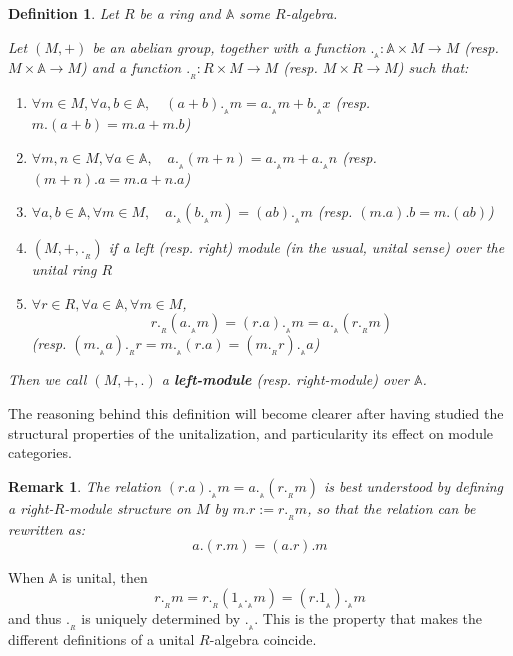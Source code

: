 \documentclass[a4paper,fleqn]{cas-sc}
\newtheorem{rem}{Remark}%
\newtheorem{dfnt}{Definition}%
\newcommand{\bA}{\mathbb{A}}
\begin{document}
\begin{dfnt}
\label{def:modules}
    Let $R$ be a ring and $\bA$ some $R$-algebra.
    
    Let  $(M,+)$ be an abelian group,
 together with a function $._{_\bA} : \bA \times M \to M$ (resp. $M \times \bA \to M$) and a function $._{_R} : R \times M \to M$ (resp. $M \times R \to M$) such that:
 \begin{enumerate}
    \item $\forall m \in M, \forall a,b \in \bA, \quad
    (a+b)._{_\bA}m = a._{_\bA}m + b._{_\bA}x$ (resp. $m.(a+b) = m.a + m.b$)
    \item $\forall m, n\in M, \forall a \in \bA, \quad
    a._{_\bA}(m+n) = a._{_\bA}m + a._{_\bA}n$ (resp. $(m+n).a = m.a + n.a$)
    \item $\forall a,b \in \bA, \forall m \in M, \quad
    a._{_\bA}(b._{_\bA}m) = (ab)._{_\bA}m$ (resp. $(m.a).b = m.(ab)$)
    \item $(M,+,._{_R})$ if a left (resp. right) module (in the usual, unital sense) over the unital ring $R$
    \item $\forall r \in R, \forall a \in \bA, \forall m \in M$,
    \[r._{_R}(a._{_\bA} m) = (r.a)._{_\bA} m = a._{_\bA} (r._{_R} m)\]
    (resp. \((m._{_\bA} a)._{_R} r = m._{_\bA} (r.a) = (m._{_R} r)._{_\bA} a\))
    
 \end{enumerate}

Then we call $(M,+,.)$ a \textbf{left-module} (resp. right-module) over $\bA$.
\end{dfnt}

The reasoning behind this definition will become clearer after having studied the structural properties of the unitalization, and particularity its effect on module categories.

\begin{rem}
The relation $(r.a)._{_\bA} m = a._{_\bA} (r._{_R} m)$ is best understood by defining a right-$R$-module structure on $M$ by $m.r := r._{_R} m$, 
so that the relation can be rewritten as:
\[a.(r.m) = (a.r).m\]
\end{rem}

When $\bA$ is unital, then 
\[
r._{_R} m = r._{_R} (1_{_\bA}._{_\bA} m) = (r.1_{_\bA} )._{_\bA} m
\]
\noindent and thus $._{_R}$ is uniquely determined by $._{_\bA}$. This is the property that makes the different definitions of a unital $R$-algebra coincide.
\end{document}
